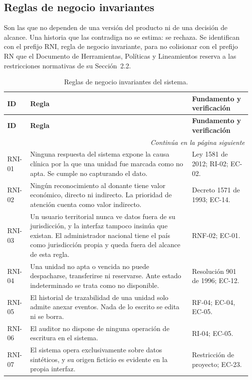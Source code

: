 \documentclass[11pt,a4paper]{article}
\newcommand{\contlinea}[1]{\multicolumn{#1}{r}{\footnotesize\itshape Continúa en la página siguiente}}
\begin{document}
\subsection{Reglas de negocio invariantes}

Son las que no dependen de una versión del producto ni de una decisión de alcance. Una historia que las contradiga no se estima: se rechaza. Se identifican con el prefijo RNI, regla de negocio invariante, para no colisionar con el prefijo RN que el Documento de Herramientas, Políticas y Lineamientos reserva a las restricciones normativas de su Sección~2.2.

\begin{longtable}{L{1.3cm} L{8.4cm} L{4.6cm}}
\caption{Reglas de negocio invariantes del sistema.}\label{tab:invariantes}\\
\toprule
\textbf{ID} & \textbf{Regla} & \textbf{Fundamento y verificación} \\
\midrule
\endfirsthead
\toprule
\textbf{ID} & \textbf{Regla} & \textbf{Fundamento y verificación} \\
\midrule
\endhead
\midrule
\contlinea{3} \\
\endfoot
\bottomrule
\endlastfoot
RNI-01 & Ninguna respuesta del sistema expone la causa clínica por la que una unidad fue marcada como no apta. Se cumple no capturando el dato. & Ley 1581 de 2012; RI-02; EC-02. \\
RNI-02 & Ningún reconocimiento al donante tiene valor económico, directo ni indirecto. La prioridad de atención cuenta como valor indirecto. & Decreto 1571 de 1993; EC-14. \\
RNI-03 & Un usuario territorial nunca ve datos fuera de su jurisdicción, y la interfaz tampoco insinúa que existan. El administrador nacional tiene el país como jurisdicción propia y queda fuera del alcance de esta regla. & RNF-02; EC-01. \\
RNI-04 & Una unidad no apta o vencida no puede despacharse, transferirse ni reservarse. Ante estado indeterminado se trata como no disponible. & Resolución 901 de 1996; EC-12. \\
RNI-05 & El historial de trazabilidad de una unidad solo admite anexar eventos. Nada de lo escrito se edita ni se borra. & RF-04; EC-04, EC-05. \\
RNI-06 & El auditor no dispone de ninguna operación de escritura en el sistema. & RI-04; EC-05. \\
RNI-07 & El sistema opera exclusivamente sobre datos sintéticos, y su origen ficticio es evidente en la propia interfaz. & Restricción de proyecto; EC-23. \\
\end{longtable}
\end{document}

